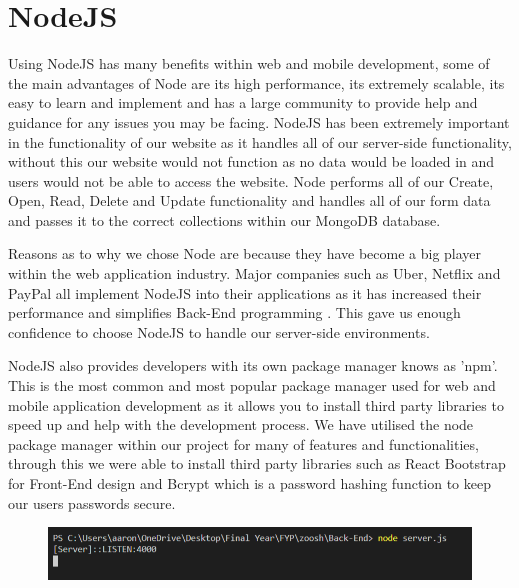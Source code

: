 \section{NodeJS}
Using NodeJS has many benefits within web and mobile development, some of the main advantages of Node are its high performance, its extremely scalable, its easy to learn and implement and has a large community to provide help and guidance for any issues you may be facing. NodeJS has been extremely important in the functionality of our website as it handles all of our server-side functionality, without this our website would not function as no data would be loaded in and users would not be able to access the website. Node performs all of our Create, Open, Read, Delete and Update functionality and handles all of our form data and passes it to the correct collections within our MongoDB database. 

Reasons as to why we chose Node are because they have become a big player within the web application industry. Major companies such as Uber, Netflix and PayPal all implement NodeJS into their applications as it has increased their performance and simplifies Back-End programming \cite{NetflixNodeJS}. This gave us enough confidence to choose NodeJS to handle our server-side environments. 

NodeJS also provides developers with its own package manager knows as 'npm'. This is the most common and most popular package manager used for web and mobile application development as it allows you to install third party libraries to speed up and help with the development process. We have utilised the node package manager within our project for many of features and functionalities, through this we were able to install third party libraries such as React Bootstrap for Front-End design and Bcrypt which is a password hashing function to keep our users passwords secure.

\begin{figure}[H]
  \centering
  \includegraphics[scale=0.55]{img/server.PNG}
  \label{fig:NodeJS Server running.}
\end{figure}

